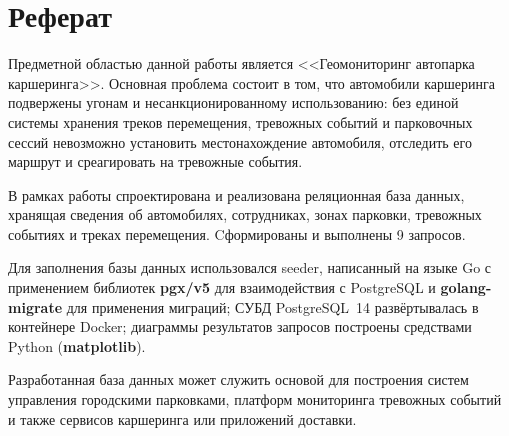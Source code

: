 \newpage
\section*{Реферат}

Предметной областью данной работы является <<Геомониторинг автопарка каршеринга>>.
Основная проблема состоит в том, что автомобили каршеринга подвержены угонам и несанкционированному использованию: без единой системы хранения треков перемещения, тревожных событий и парковочных сессий невозможно установить местонахождение автомобиля, отследить его маршрут и среагировать на тревожные события.

В рамках работы спроектирована и реализована реляционная база данных, хранящая сведения об автомобилях, сотрудниках, зонах парковки, тревожных событиях и треках перемещения. Cформированы и выполнены 9 запросов.

Для заполнения базы данных использовался seeder, написанный на языке Go с применением библиотек \textbf{pgx/v5} для взаимодействия с PostgreSQL и \textbf{golang-migrate} для применения миграций; СУБД PostgreSQL~14 развёртывалась в контейнере Docker; диаграммы результатов запросов построены средствами Python (\textbf{matplotlib}).

Разработанная база данных может служить основой для построения систем управления городскими парковками, платформ мониторинга тревожных событий и также сервисов каршеринга или приложений доставки.

\newpage

